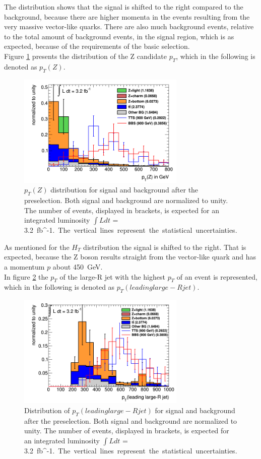 The distribution shows that the signal is shifted to the right compared to the background, because there are higher momenta in the events resulting from the very massive vector-like quarks.
There are also much background events, relative to the total amount of background events, in the signal region, which is as expected, because of the requirements of the basic selection. \\
Figure \ref{Zpt} presents the distribution of the Z candidate $p_{T}$, which in the following is denoted as $p_{T}(Z)$.
\begin{figure}
\centering
\includegraphics[width=8cm]{figures/Zpt.png}
\caption{$p_{T}(Z)$ distribution for signal and background after the preselection. 
Both signal and background are normalized to unity.  
The number of events, displayed in brackets, is expected for an integrated luminosity $\int L dt$ = \SI{3.2}{fb^{-1}.}
The vertical lines represent the statistical uncertainties.}
\label{Zpt}
\end{figure}

As mentioned for the $H_{T}$ distribution the signal is shifted to the right. That is expected, because the Z boson results straight from the vector-like quark and has a momentum $p$ about \SI{450}{GeV}.\\
In figure \ref{leadingljet} the $p_{T}$ of the large-R jet with the highest $p_{T}$ of an event is represented, which in the following is denoted as $p_{T}(leading large-R jet)$.
\vspace{-0.5cm}
\begin{figure}[h!]
\centering
\includegraphics[width=8cm]{figures/leadingljet.png}
\caption{Distribution of $p_{T}(leading large-R jet)$ for signal and background after the preselection. 
Both signal and background are normalized to unity.  
The number of events, displayed in brackets, is expected for an integrated luminosity $\int L dt$ = \SI{3.2}{fb^{-1}.}
The vertical lines represent the statistical uncertainties.}
\label{leadingljet}
\end{figure}

